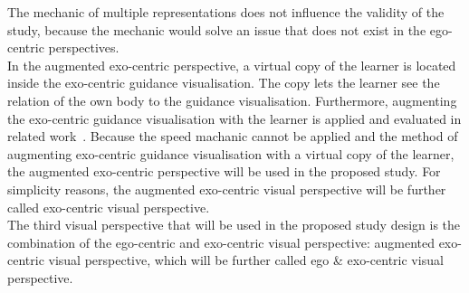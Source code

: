 The mechanic of multiple representations does not influence the validity of the study, because the mechanic would solve an issue that does not exist in the ego-centric perspectives.\\
In the augmented exo-centric perspective, a virtual copy of the learner is located inside the exo-centric guidance visualisation. The copy lets the learner see the relation of the own body to the guidance visualisation. Furthermore, augmenting the exo-centric guidance visualisation with the learner is applied and evaluated in related work~\cite{YouMove,thaichichua}. 
Because the speed machanic cannot be applied and the method of augmenting exo-centric guidance visualisation with a virtual copy of the learner, the augmented exo-centric perspective will be used in the proposed study. For simplicity reasons, the augmented exo-centric visual perspective will be further called exo-centric visual perspective.\\
The third visual perspective that will be used in the proposed study design is the combination of the ego-centric and exo-centric visual perspective: augmented exo-centric visual perspective, which will be further called ego \& exo-centric visual perspective.\\

